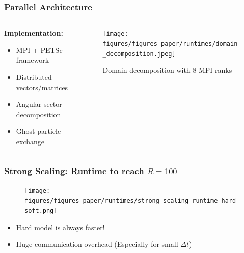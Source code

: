 \documentclass[10pt,t]{beamer}
\begin{document}
\begin{frame}
    \frametitle{Parallel Architecture}

    \begin{columns}[c]
        \begin{column}{0.5\textwidth}
            \textbf{Implementation:}
            \begin{itemize}
                \item MPI + PETSc framework
                \item Distributed vectors/matrices
                \item Angular sector decomposition
                \item Ghost particle exchange
            \end{itemize}
        \end{column}

        \begin{column}{0.5\textwidth}
            \vspace{-0.3cm}
            \begin{figure}
                \centering
                \texttt{[image: figures/figures\_paper/runtimes/domain\_decomposition.jpeg]}
                \caption*{\scriptsize{Domain decomposition with 8 MPI ranks}}
            \end{figure}
        \end{column}
    \end{columns}

\end{frame}

\begin{frame}
    \frametitle{Strong Scaling: Runtime to reach $R=100$}

    \begin{figure}
        \centering
        \texttt{[image: figures/figures\_paper/runtimes/strong\_scaling\_runtime\_hard\_soft.png]}
    \end{figure}

    \begin{itemize}
        \item Hard model is always faster!
        \item Huge communication overhead (Especially for small $\Delta t$)
    \end{itemize}

\end{frame}

\end{document}
